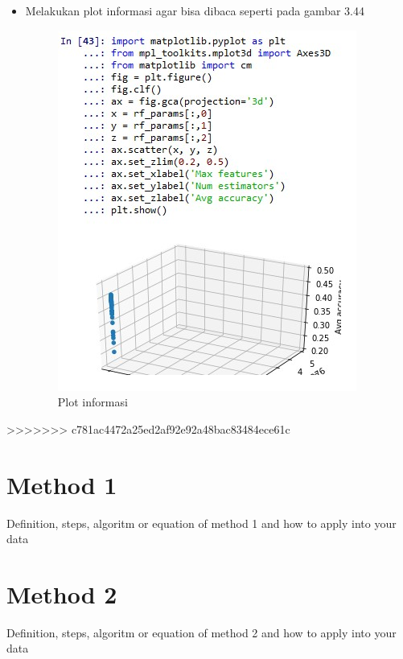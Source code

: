 \begin{enumerate}
\begin{itemize}
		\item Melakukan plot informasi agar bisa dibaca  seperti pada gambar 3.44
			\begin{figure}[ht]
			\centering
			\includegraphics[scale=0.7]{figures/PRF/8_2.png}
			\caption{Plot informasi}
			\end{figure}
	\end{itemize}
\end{enumerate}





>>>>>>> c781ac4472a25ed2af92e92a48bac83484ece61c
\section{Method 1}
Definition, steps, algoritm or equation of method 1 and how to apply into your data
\section{Method 2}
Definition, steps, algoritm or equation of method 2 and how to apply into your data